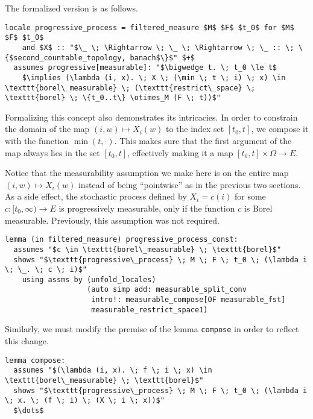 The formalized version is as follows.

\begin{isadefinition}
{\small
\begin{lstlisting}[style=isabelle]
locale progressive_process = filtered_measure $M$ $F$ $t_0$ for $M$ $F$ $t_0$
	and $X$ :: "$\_ \; \Rightarrow \; \_ \; \Rightarrow \; \_ :: \; \{$second_countable_topology, banach$\}$" $+$
  assumes progressive[measurable]: "$\bigwedge t. \; t_0 \le t$
	$\implies (\lambda (i, x). \; X \; (\min \; t \; i) \; x) \in \texttt{borel\_measurable} \; (\texttt{restrict\_space} \; \texttt{borel} \; \{t_0..t\} \otimes_M (F \; t))$"
\end{lstlisting}
}
\end{isadefinition}

Formalizing this concept also demonstrates its intricacies. In order to constrain the domain of the map $(i, w) \mapsto X_i(w)$ to the index set $[t_0, t]$, we compose it with the function $\min(t, \cdot)$. This makes sure that the first argument of the map always lies in the set $[t_0, t]$, effectively making it a map $[t_0, t] \times \Omega \rightarrow E$. 

Notice that the measurability assumption we make here is on the entire map $(i, w) \mapsto X_i(w)$ instead of being ``pointwise'' as in the previous two sections. As a side effect, the stochastic process defined by $X_i = c(i)$ for some $c : [t_0, \infty) \rightarrow E$ is progressively measurable, only if the function $c$ is Borel measurable. Previously, this assumption was not required.

\begin{isalemma}
{\small
\begin{lstlisting}[style=isabelle]
lemma (in filtered_measure) progressive_process_const:
  assumes "$c \in \texttt{borel\_measurable} \; \texttt{borel}$"
  shows "$\texttt{progressive\_process} \; M \; F \; t_0 \; (\lambda i \; \_. \; c \; i)$"
    using assms by (unfold_locales) 
				   (auto simp add: measurable_split_conv 
					intro!: measurable_compose[OF measurable_fst] 
					measurable_restrict_space1)
  \end{lstlisting}
}
\end{isalemma}

Similarly, we must modify the premise of the lemma \texttt{compose} in order to reflect this change.

\begin{isalemma}
{\small
\begin{lstlisting}[style=isabelle]
lemma compose:
  assumes "$(\lambda (i, x). \; f \; i \; x) \in \texttt{borel\_measurable} \; \texttt{borel}$"
  shows "$\texttt{progressive\_process} \; M \; F \; t_0 \; (\lambda i \; x. \; (f \; i) \; (X \; i \; x))$"
  $\dots$
  \end{lstlisting}
}
\end{isalemma}

